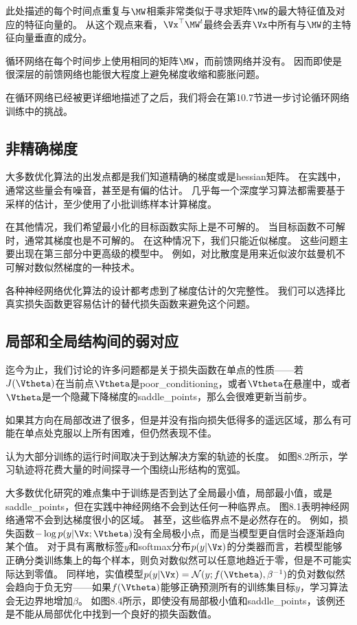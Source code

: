 此处描述的每个时间点重复与$\MW$相乘非常类似于寻求矩阵$\MW$的最大特征值及对应的特征向量的。
从这个观点来看，$\Vx^\top\MW^t$最终会丢弃$\Vx$中所有与$\MW$的主特征向量垂直的成分。

循环网络在每个时间步上使用相同的矩阵$\MW$，而前馈网络并没有。
因而即使是很深层的前馈网络也能很大程度上避免梯度收缩和膨胀问题\citep{Sussillo14}。

在循环网络已经被更详细地描述了之后，我们将会在第10.7节进一步讨论循环网络训练中的挑战。

\subsection{非精确梯度}
\label{sec:inexact_gradients}
大多数优化算法的出发点都是我们知道精确的梯度或是\gls{hessian}矩阵。
在实践中，通常这些量会有噪音，甚至是有偏的估计。
几乎每一个深度学习算法都需要基于采样的估计，至少使用了小批训练样本计算梯度。


在其他情况，我们希望最小化的目标函数实际上是不可解的。
当目标函数不可解时，通常其梯度也是不可解的。
在这种情况下，我们只能近似梯度。
这些问题主要出现在第三部分中更高级的模型中。
例如，对比散度是用来近似波尔兹曼机不可解对数似然梯度的一种技术。

各种神经网络优化算法的设计都考虑到了梯度估计的欠完整性。
我们可以选择比真实损失函数更容易估计的替代损失函数来避免这个问题。

\subsection{局部和全局结构间的弱对应}
\label{sec:poor_correspondence_between_local_and_global_structure}
迄今为止，我们讨论的许多问题都是关于损失函数在单点的性质——若$J(\Vtheta)$在当前点$\Vtheta$是\gls{poor_conditioning}，或者$\Vtheta$在悬崖中，或者$\Vtheta$是一个隐藏下降梯度的\gls{saddle_points}，那么会很难更新当前步。

如果其方向在局部改进了很多，但是并没有指向损失低得多的遥远区域，那么有可能在单点处克服以上所有困难，但仍然表现不佳。

\cite{GoodfellowOptimization15}认为大部分训练的运行时间取决于到达解决方案的轨迹的长度。 
如图8.2所示，学习轨迹将花费大量的时间探寻一个围绕山形结构的宽弧。

大多数优化研究的难点集中于训练是否到达了全局最小值，局部最小值，或是\gls{saddle_points}，但在实践中神经网络不会到达任何一种临界点。
图8.1表明神经网络通常不会到达梯度很小的区域。
甚至，这些临界点不是必然存在的。
例如，损失函数$-\log p(y|\Vx;\Vtheta)$没有全局极小点，而是当模型更自信时会逐渐趋向某个值。    
对于具有离散标签$y$和softmax分布$p(y|\Vx)$的分类器而言，若模型能够正确分类训练集上的每个样本，则负对数似然可以任意地趋近于零，但是不可能实际达到零值。
同样地，实值模型$p(y|\Vx) = \mathcal{N}(y;f(\Vtheta),\beta^{-1})$的负对数似然会趋向于负无穷——如果$f(\Vtheta)$能够正确预测所有的训练集目标$y$，学习算法会无边界地增加$\beta$。
如图8.4所示，即使没有局部极小值和\gls{saddle_points}，该例还是不能从局部优化中找到一个良好的损失函数值。


